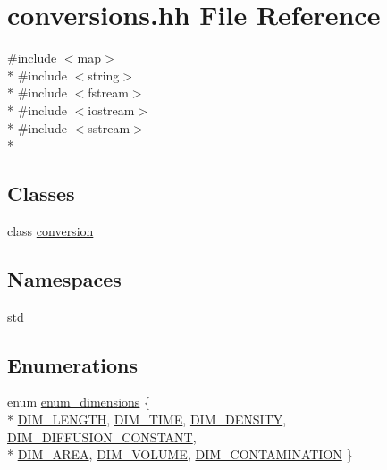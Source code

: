 \hypertarget{conversions_8hh}{}\section{conversions.\+hh File Reference}
\label{conversions_8hh}
{\ttfamily \#include $<$map$>$}\\*
{\ttfamily \#include $<$string$>$}\\*
{\ttfamily \#include $<$fstream$>$}\\*
{\ttfamily \#include $<$iostream$>$}\\*
{\ttfamily \#include $<$sstream$>$}\\*
\subsection*{Classes}
\begin{DoxyCompactItemize}
\item 
class \hyperlink{classconversion}{conversion}
\end{DoxyCompactItemize}
\subsection*{Namespaces}
\begin{DoxyCompactItemize}
\item 
 \hyperlink{namespacestd}{std}
\end{DoxyCompactItemize}
\subsection*{Enumerations}
\begin{DoxyCompactItemize}
\item 
enum \hyperlink{conversions_8hh_a1218b94f6f10bf510066fee10d610464}{enum\+\_\+dimensions} \{ \\*
\hyperlink{conversions_8hh_a1218b94f6f10bf510066fee10d610464a451c9349aed8f81d728376610e82cf04}{D\+I\+M\+\_\+\+L\+E\+N\+G\+TH}, 
\hyperlink{conversions_8hh_a1218b94f6f10bf510066fee10d610464ad64dbab5cd609f7d04a32fbf7a5d16a0}{D\+I\+M\+\_\+\+T\+I\+ME}, 
\hyperlink{conversions_8hh_a1218b94f6f10bf510066fee10d610464a5e94b061054683fef4e20a48def8352c}{D\+I\+M\+\_\+\+D\+E\+N\+S\+I\+TY}, 
\hyperlink{conversions_8hh_a1218b94f6f10bf510066fee10d610464af8191d1e9834e92c31f2c90517ff781c}{D\+I\+M\+\_\+\+D\+I\+F\+F\+U\+S\+I\+O\+N\+\_\+\+C\+O\+N\+S\+T\+A\+NT}, 
\\*
\hyperlink{conversions_8hh_a1218b94f6f10bf510066fee10d610464aa9037e32fcf7a80c5bd71f230ab5046b}{D\+I\+M\+\_\+\+A\+R\+EA}, 
\hyperlink{conversions_8hh_a1218b94f6f10bf510066fee10d610464a8e6b0d491586d67b94a25f5349efe259}{D\+I\+M\+\_\+\+V\+O\+L\+U\+ME}, 
\hyperlink{conversions_8hh_a1218b94f6f10bf510066fee10d610464ab7f295d8fd1b2b91c22eba5c7e83bbea}{D\+I\+M\+\_\+\+C\+O\+N\+T\+A\+M\+I\+N\+A\+T\+I\+ON}
 \}
\end{DoxyCompactItemize}


